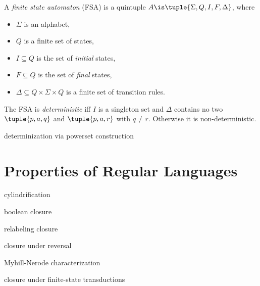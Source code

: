 \begin{definition}
    A \emph{finite state automaton} (FSA) is a quintuple $A \is \tuple{\Sigma, Q, I, F, \Delta}$, where
    \begin{itemize}
        \item $\Sigma$ is an alphabet,
        \item $Q$ is a finite set of states,
        \item $I \subseteq Q$ is the set of \emph{initial} states,
        \item $F \subseteq Q$ is the set of \emph{final} states,
        \item $\Delta \subseteq Q \times \Sigma \times Q$ is a finite set of transition rules.
    \end{itemize}
    The FSA is \emph{deterministic} iff $I$ is a singleton set and $\Delta$ contains no two $\tuple{p,a,q}$ and $\tuple{p,a,r}$ with $q \neq r$.
    Otherwise it is non-deterministic.
\end{definition}

determinization via powerset construction

\section{Properties of Regular Languages}

cylindrification

boolean closure

relabeling closure

closure under reversal

Myhill-Nerode characterization

closure under finite-state transductions
